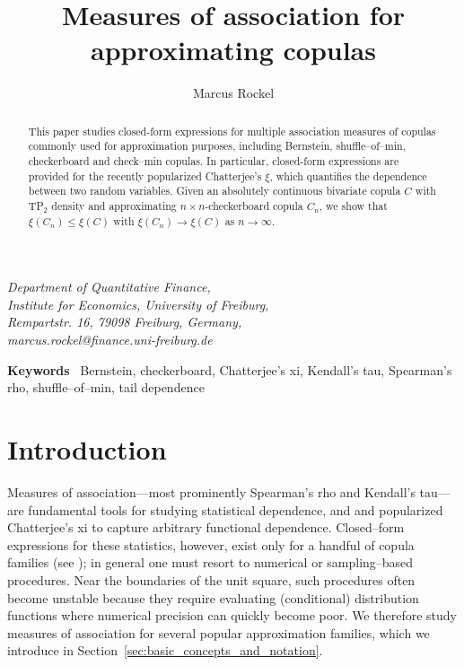 \documentclass{article}
\author{Marcus Rockel}
\title{Measures of association for approximating copulas}
\theoremstyle{definition}
\begin{document}
\maketitle
\vspace{-5ex}

\begin{center}
	\small\textit{
		Department of Quantitative Finance,\\
		Institute for Economics, University of Freiburg,\\
		Rempartstr. 16,	79098 Freiburg, Germany,\\
        marcus.rockel@finance.uni-freiburg.de \\[2mm]
	}
\end{center}
\begin{abstract}
    This paper studies closed-form expressions for multiple association measures of copulas commonly used for approximation purposes, including Bernstein, shuffle--of--min, checkerboard and check--min copulas.
    In particular, closed-form expressions are provided for the recently popularized Chatterjee's $\xi$, which quantifies the dependence between two random variables.
    Given an absolutely continuous bivariate copula $C$ with TP$_2$ density and approximating $n\times n$-checkerboard copula $C_n$, we show that $\xi(C_n) \le \xi(C)$ with $\xi(C_n) \to \xi(C)$ as $n\to\infty$.
\end{abstract}
\vspace{0ex}
\textbf{Keywords }~Bernstein, checkerboard, Chatterjee's xi, Kendall's tau, Spearman's rho, shuffle--of--min, tail dependence

\section{Introduction}
\label{sec:introduction}

Measures of association—most prominently Spearman's rho and Kendall's tau—are fundamental tools for studying statistical dependence, and \cite{chatterjee2020} and \cite{chatterjee2021} popularized Chatterjee's xi to capture arbitrary functional dependence.
Closed--form expressions for these statistics, however, exist only for a handful of copula families (see \cite[Table~6]{ansari2024dependence}); in general one must resort to numerical or sampling–based procedures.
Near the boundaries of the unit square, such procedures often become unstable because they require evaluating (conditional) distribution functions where numerical precision can quickly become poor.
We therefore study measures of association for several popular approximation families, which we introduce in Section~\ref{sec:basic_concepts_and_notation}.
\end{document}
